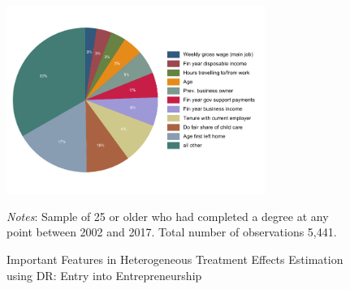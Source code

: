 \documentclass[12pt, a4paper]{article}
\begin{document}
%
%

\begin{figure}[H]
\centering
\caption{Important Features in Heterogeneous Treatment Effects Estimation using DR: Entry into Entrepreneurship}
\vspace{0.5cm}
  \label{fig:featgbrDRe}
    \includegraphics[width=0.75\textwidth]{_figures/DR_influenceP_GBR_chself_100.pdf}
\parbox{1\textwidth}{\footnotesize{\textit{Notes}: Sample of 25 or older who had completed a degree at any point between 2002 and 2017. Total number of observations 5,441.}}
\end{figure}
\end{document}
